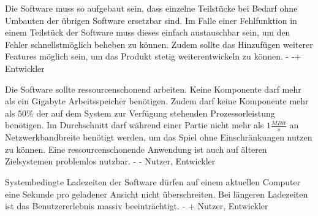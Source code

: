         {Die Software muss so aufgebaut sein, dass einzelne Teilstücke bei Bedarf ohne Umbauten der übrigen Software ersetzbar sind.}
        {Im Falle einer Fehlfunktion in einem Teilstück der Software muss dieses einfach austauschbar sein, um den Fehler schnellstmöglich beheben zu können. Zudem sollte das Hinzufügen weiterer Features möglich sein, um das Produkt stetig weiterentwickeln zu können.}
        {-}
        {-+}
        {Entwickler}

        {Die Software sollte ressourcenschonend arbeiten. Keine Komponente darf mehr als ein Gigabyte Arbeitsspeicher benötigen. Zudem darf keine Komponente mehr als $50\%$ der auf dem System zur Verfügung stehenden Prozessorleistung benötigen. Im Durchschnitt darf während einer Partie nicht mehr als $1\frac{MBit}{s}$ an Netzwerkbandbreite benötigt werden, um das Spiel ohne Einschränkungen nutzen zu können.}
        {Eine ressourcenschonende Anwendung ist auch auf älteren Zielsystemen problemlos nutzbar.}
        {-}
        {-}
        {Nutzer, Entwickler}

        {Systembedingte Ladezeiten der Software dürfen auf einem aktuellen Computer eine Sekunde pro geladener Ansicht nicht überschreiten.}
        {Bei längeren Ladezeiten ist das Benutzererlebnis massiv beeinträchtigt.}
        {-}
        {+}
        {Nutzer, Entwickler}
